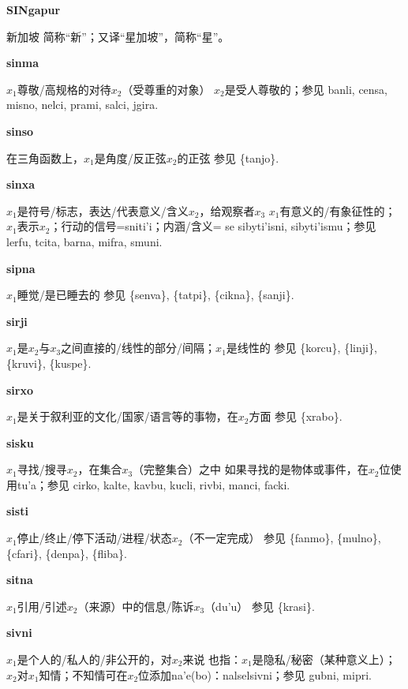 \documentclass[notitlepage,twocolumn,a4paper,10pt]{book}
\begin{document}
{\sffamily\bfseries SINgapur} 新加坡 \textemdash{} 简称“新”；又译“星加坡”，简称“星”。

{\sffamily\bfseries sinma}\enspace {\ttfamily\bfseries[        si'a]}  $x_1$尊敬\slash{}高规格的对待$x_2$（受尊重的对象） \textemdash{} $x_2$是受人尊敬的；参见 {banli}, {censa}, {misno}, {nelci}, {prami}, {salci}, {jgira}.

{\sffamily\bfseries sinso} 在三角函数上，$x_1$是角度\slash{}反正弦$x_2$的正弦 \textemdash{} 参见 \{tanjo\}.

{\sffamily\bfseries sinxa}\enspace {\ttfamily\bfseries[    sni]}  $x_1$是符号\slash{}标志，表达\slash{}代表意义\slash{}含义$x_2$，给观察者$x_3$ \textemdash{} $x_1$有意义的\slash{}有象征性的；$x_1$表示$x_2$；行动的信号={sniti'i}；内涵\slash{}含义= se {sibyti'isni}, {sibyti'ismu}；参见 {lerfu}, {tcita}, {barna}, {mifra}, {smuni}.

{\sffamily\bfseries sipna}\enspace {\ttfamily\bfseries[sip]}  $x_1$睡觉\slash{}是已睡去的 \textemdash{} 参见 \{senva\}, \{tatpi\}, \{cikna\}, \{sanji\}.

{\sffamily\bfseries sirji}\enspace {\ttfamily\bfseries[sir]}  $x_1$是$x_2$与$x_3$之间直接的\slash{}线性的部分\slash{}间隔；$x_1$是线性的 \textemdash{} 参见 \{korcu\}, \{linji\}, \{kruvi\}, \{kuspe\}.

{\sffamily\bfseries sirxo}\enspace {\ttfamily\bfseries[six]}  $x_1$是关于叙利亚的文化\slash{}国家\slash{}语言等的事物，在$x_2$方面 \textemdash{} 参见 \{xrabo\}.

{\sffamily\bfseries sisku}\enspace {\ttfamily\bfseries[sis]}  $x_1$寻找\slash{}搜寻$x_2$，在集合$x_3$（完整集合）之中 \textemdash{} 如果寻找的是物体或事件，在$x_2$位使用tu'a；参见 {cirko}, {kalte}, {kavbu}, {kucli}, {rivbi}, {manci}, {facki}.

{\sffamily\bfseries sisti}\enspace {\ttfamily\bfseries[    sti]}  $x_1$停止\slash{}终止\slash{}停下活动\slash{}进程\slash{}状态$x_2$（不一定完成） \textemdash{} 参见 \{fanmo\}, \{mulno\}, \{cfari\}, \{denpa\}, \{fliba\}.

{\sffamily\bfseries sitna}\enspace {\ttfamily\bfseries[sit]}  $x_1$引用\slash{}引述$x_2$（来源）中的信息\slash{}陈诉$x_3$（du'u） \textemdash{} 参见 \{krasi\}.

{\sffamily\bfseries sivni}\enspace {\ttfamily\bfseries[siv]}  $x_1$是个人的\slash{}私人的\slash{}非公开的，对$x_2$来说 \textemdash{} 也指：$x_1$是隐私\slash{}秘密（某种意义上）；$x_2$对$x_1$知情；不知情可在$x_2$位添加na'e(bo)：{nalselsivni}；参见 {gubni}, {mipri}.
\end{document}

